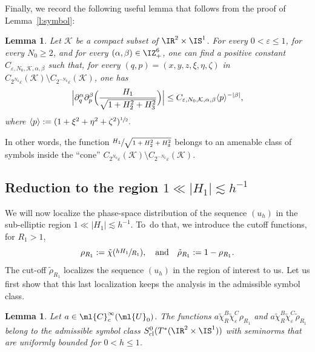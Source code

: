 \documentclass[10pt]{amsart}
\theoremstyle{plain}
\newtheorem{lemm}[theo]{Lemma}
\theoremstyle{definition}
\theoremstyle{remark}
\begin{document}
Finally, we record the following useful lemma that follows from the proof of Lemma~\ref{l:symbol}:

\begin{lemm}\label{l:symbol-cone} Let $\mathcal{K}$ be a compact subset of $\IR^2\times\IS^1$. For every $0<\varepsilon\leq 1$, for every $N_0\geq 2$, and for every $(\alpha,\beta)\in\IZ_+^6$, one can find a positive constant $C_{\varepsilon, N_0, \mathcal{K}, \alpha,\beta}$ such that, for every $(q,p)=(x,y,z,\xi,\eta,\zeta)$ in $C_{2^{N_0}\varepsilon}(\mathcal{K})\setminus C_{2^{-N_0}\varepsilon}(\mathcal{K})$, one has
\[
\Bigl|\partial^\alpha_{q}\partial_{p}^\beta \Bigl(\frac{H_1}{\sqrt{1+H_2^2+H_3^2}}\Bigr)\Bigr|\leq C_{\varepsilon, N_0, \mathcal{K},\alpha,\beta}\langle p\rangle^{-|\beta|},
\]
where $\langle p\rangle:=(1+\xi^2+\eta^2+\zeta^2)^{\sfrac{1}{2}}.$
\end{lemm}
In other words, the function $\sfrac{H_1}{\sqrt{1+H_2^2+H_3^2}}$ belongs to an amenable class of symbols inside the ``cone'' $C_{2^{N_0}\varepsilon}(\mathcal{K})\setminus C_{2^{-N_0}\varepsilon}(\mathcal{K})$.

\subsection{Reduction to the region $ 1 \ll \vert H_1 \vert \lesssim h^{-1}$} \label{ss:largeH1}

We will now localize the phase-space distribution of the sequence $(u_h)$ in the sub-elliptic region $ 1 \ll \vert H_1 \vert \lesssim h^{-1}$. To~do that, we introduce the cutoff functions, for $R_1>1$,
\[
\rho_{R_1}:=\tilde{\chi}(\sfrac{hH_1}{R_1}),\quad \text{and}\quad \tilde{\rho}_{R_1}:=1-\rho_{R_1}.
\]
The cut-off $\tilde{\rho}_{R_1}$ localizes the sequence $(u_h)$ in the region of interest to us. Let us first show that this last localization keeps the analysis in the admissible symbol class.

\begin{lemm}\label{l:cutoffH1} Let $a\in\ml{C}^{\infty}_c(\ml{U}_0)$. The functions $a\tilde{\chi}_R^B\tilde{\chi}_\varepsilon^C\rho_{R_1}$ and $a\tilde{\chi}_R^B\tilde{\chi}_\varepsilon^C\tilde{\rho}_{R_1}$ belong to the admissible symbol class $S_{\operatorname{cl}}^0(T^*(\IR^2\times\IS^1))$ with seminorms that are uniformly bounded for $0<h\leq 1$.
\end{lemm}
\end{document}

